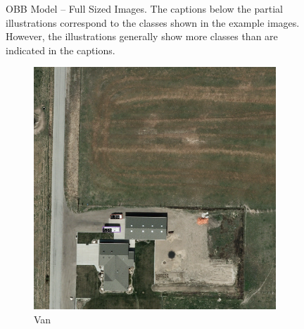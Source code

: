 \begin{figure}[h!]
    \caption[OBB Model – Full Sized Images]{OBB Model – Full Sized Images. The captions below the partial illustrations correspond to the classes shown in the example images. However, the illustrations generally show more classes than are indicated in the captions.}
    \label{fig:OBB_examples_fs}
\end{figure}



\begin{figure}[h!]
    \centering
    \begin{subfigure}[t]{0.38\textwidth}
        \centering
        \includegraphics[width=\linewidth]{images/015Results/01abb_vs_obb/comp_images/aab_old/198.png}
        \caption{Van}
    \end{subfigure}
    \begin{subfigure}[t]{0.38\textwidth}
        \centering

\end{subfigure}
\end{figure}
